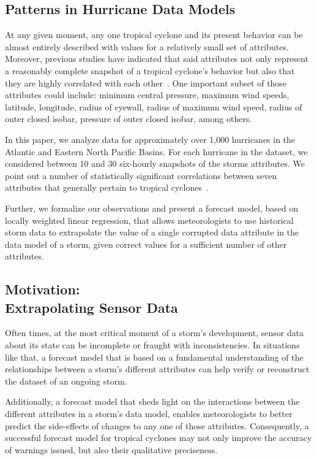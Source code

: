 \documentclass[letterpaper,twocolumn,10pt]{article}
\begin{document}
\subsection{Patterns in Hurricane Data Models}
At any given moment, any one tropical cyclone and its present behavior can be
almost entirely described with values for a relatively small set of attributes.
Moreover, previous studies have indicated that said attributes not only
represent a reasonably complete snapshot of a tropical cyclone's behavior but
also that they are highly correlated with each other~\cite{SHIPS}. One important
subset of those attributes could include: minimum central pressure, maximum wind
speeds, latitude, longitude, radius of eyewall, radius of maximum wind speed,
radius of outer closed isobar, pressure of outer closed isobar, among others.

In this paper, we analyze data for approximately over 1,000 hurricanes in the
Atlantic and Eastern North Pacific Basins. For each hurricane in the dataset, we
considered between 10 and 30 six-hourly snapshots of the storms attributes. We
point out a number of statistically significant correlations between seven
attributes that generally pertain to tropical cyclones~\cite{SHIPS}.

Further, we formalize our observations and present a forecast
model, based on locally weighted linear regression, that allows meteorologists
to use historical storm data to extrapolate the value of a single corrupted data
attribute in the data model of a storm, given correct values for a sufficient
number of other attributes.

\subsection{Motivation:\\Extrapolating Sensor Data}
Often times, at the most critical moment of a storm's development, sensor data
about its state can be incomplete or fraught with inconsistencies. In situations
like that, a forecast model that is based on a fundamental understanding of the
relationships between a storm's different attributes can help verify or 
reconstruct the dataset of an ongoing storm.

Additionally, a forecast model that sheds light on the interactions between
the different attributes in a storm's data model, enables meteorologists to
better predict the side-effects of changes to any one of those attributes.
Consequently, a successful forecast model for tropical cyclones may not only
improve the accuracy of warnings issued, but also their qualitative preciseness.
\end{document}
